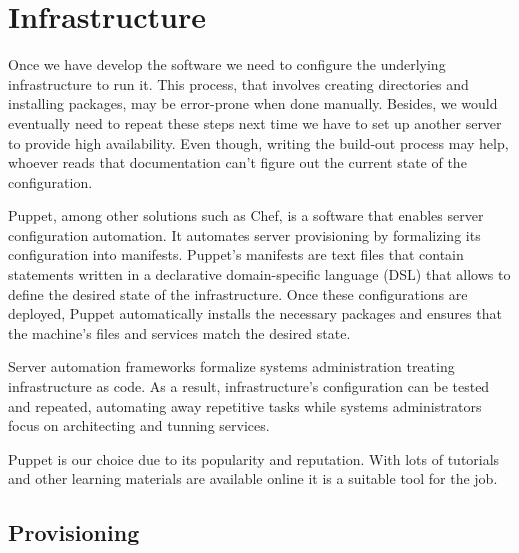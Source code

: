 \chapter{Infrastructure}

Once we have develop the software we need to configure the underlying infrastructure to run it. This process, that involves creating directories and installing packages, may be error-prone when done manually. Besides, we would eventually need to repeat these steps next time we have to set up another server to provide high availability. Even though, writing the build-out process may help, whoever reads that documentation can't figure out the current state of the configuration.

Puppet, among other solutions such as Chef, is a software that enables server configuration automation. It automates server provisioning by formalizing its configuration into manifests. Puppet's manifests are text files that contain statements written in a declarative domain-specific language (DSL) that allows to define the desired state of the infrastructure. Once these configurations are deployed, Puppet automatically installs the necessary packages and ensures that the machine’s files and services match the desired state.

Server automation frameworks formalize systems administration treating infrastructure as code. As a result, infrastructure's configuration can be tested and repeated, automating away repetitive tasks while systems administrators focus on architecting and tunning services.

Puppet is our choice due to its popularity and reputation. With lots of tutorials and other learning materials are available online it is a suitable tool for the job.

\section{Provisioning}



